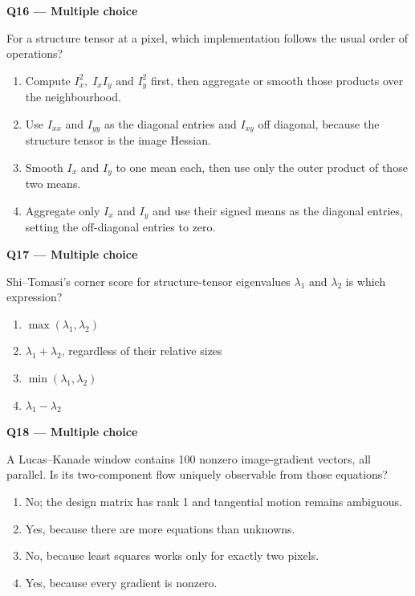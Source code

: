 \documentclass[11pt,a4paper]{article}
\begin{document}
\par\vspace{12pt}
\begin{minipage}{\linewidth}
\textbf{Q16 — Multiple choice}\par\smallskip
For a structure tensor at a pixel,\allowbreak{} which implementation follows the usual order of operations?
\begin{enumerate}[label=\textbf{\Alph*.}]
\item Compute \(I_x^2,\;I_x I_y\text{ and }I_y^2\) first,\allowbreak{} then aggregate or smooth those products over the neighbourhood.
\item Use \(I_{xx}\) and \(I_{yy}\) as the diagonal entries and \(I_{xy}\) off diagonal,\allowbreak{} because the structure tensor is the image Hessian.
\item Smooth \(I_x\) and \(I_y\) to one mean each,\allowbreak{} then use only the outer product of those two means.
\item Aggregate only \(I_x\) and \(I_y\) and use their signed means as the diagonal entries,\allowbreak{} setting the off-diagonal entries to zero.
\end{enumerate}
\end{minipage}
\par\vspace{12pt}
\begin{minipage}{\linewidth}
\textbf{Q17 — Multiple choice}\par\smallskip
Shi–Tomasi's corner score for structure-tensor eigenvalues \(\lambda_1\text{ and }\lambda_2\) is which expression?
\begin{enumerate}[label=\textbf{\Alph*.}]
\item \(\max(\lambda_1,\lambda_2)\)
\item \(\lambda_1+\lambda_2\),\allowbreak{} regardless of their relative sizes
\item \(\min(\lambda_1,\lambda_2)\)
\item \(\lambda_1-\lambda_2\)
\end{enumerate}
\end{minipage}
\par\vspace{12pt}
\begin{minipage}{\linewidth}
\textbf{Q18 — Multiple choice}\par\smallskip
A Lucas–Kanade window contains 100 nonzero image-gradient vectors,\allowbreak{} all parallel. Is its two-component flow uniquely observable from those equations?
\begin{enumerate}[label=\textbf{\Alph*.}]
\item No; the design matrix has rank 1 and tangential motion remains ambiguous.
\item Yes,\allowbreak{} because there are more equations than unknowns.
\item No,\allowbreak{} because least squares works only for exactly two pixels.
\item Yes,\allowbreak{} because every gradient is nonzero.
\end{enumerate}
\end{minipage}
\end{document}
